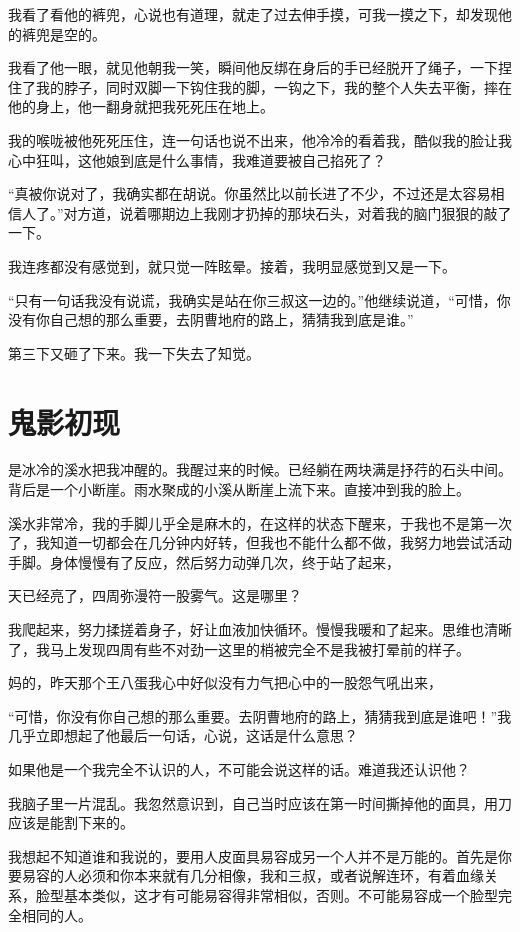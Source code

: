 我看了看他的裤兜，心说也有道理，就走了过去伸手摸，可我一摸之下，却发现他的裤兜是空的。

我看了他一眼，就见他朝我一笑，瞬间他反绑在身后的手已经脱开了绳子，一下捏住了我的脖子，同时双脚一下钩住我的脚，一钩之下，我的整个人失去平衡，摔在他的身上，他一翻身就把我死死压在地上。

我的喉咙被他死死压住，连一句话也说不出来，他冷冷的看着我，酷似我的脸让我心中狂叫，这他娘到底是什么事情，我难道要被自己掐死了？

“真被你说对了，我确实都在胡说。你虽然比以前长进了不少，不过还是太容易相信人了。”对方道，说着哪期边上我刚才扔掉的那块石头，对着我的脑门狠狠的敲了一下。

我连疼都没有感觉到，就只觉一阵眩晕。接着，我明显感觉到又是一下。

“只有一句话我没有说谎，我确实是站在你三叔这一边的。”他继续说道，“可惜，你没有你自己想的那么重要，去阴曹地府的路上，猜猜我到底是谁。”

第三下又砸了下来。我一下失去了知觉。

\chapter{鬼影初现}

是冰冷的溪水把我冲醒的。我醒过来的时候。已经躺在两块满是抒荇的石头中间。背后是一个小断崖。雨水聚成的小溪从断崖上流下来。直接冲到我的脸上。

溪水非常冷，我的手脚儿乎全是麻木的，在这样的状态下醒来，于我也不是第一次了，我知道一切都会在几分钟内好转，但我也不能什么都不做，我努力地尝试活动手脚。身体慢慢有了反应，然后努力动弹几次，终于站了起来，

天已经亮了，四周弥漫符一股雾气。这是哪里？

我爬起来，努力揉搓着身子，好让血液加快循环。慢慢我暖和了起来。思维也清晰了，我马上发现四周有些不对劲一这里的梢被完全不是我被打晕前的样子。

妈的，昨天那个王八蛋我心中好似没有力气把心中的一股怨气吼出来，

“可惜，你没有你自己想的那么重要。去阴曹地府的路上，猜猜我到底是谁吧！”我几乎立即想起了他最后一句话，心说，这话是什么意思？

如果他是一个我完全不认识的人，不可能会说这样的话。难道我还认识他？

我脑子里一片混乱。我忽然意识到，自己当时应该在第一时间撕掉他的面具，用刀应该是能割下来的。

我想起不知道谁和我说的，要用人皮面具易容成另一个人并不是万能的。首先是你要易容的人必须和你本来就有几分相像，我和三叔，或者说解连环，有着血缘关系，脸型基本类似，这才有可能易容得非常相似，否则。不可能易容成一个脸型完全相同的人。

